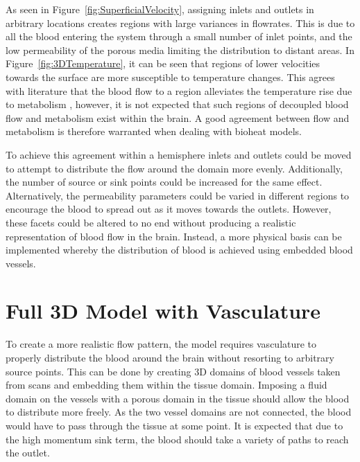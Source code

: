\documentclass[11pt,english,a4paper,twoside,openright]{report}
\begin{document}
{{{{{{{{As seen in Figure~\ref{fig:SuperficialVelocity}, assigning inlets and outlets in arbitrary locations creates regions with large variances in flowrates. This is due to all the blood entering the system through a small number of inlet points, and the low permeability of the porous media limiting the distribution to distant areas. In Figure~\ref{fig:3DTemperature}, it can be seen that regions of lower velocities towards the surface are more susceptible to temperature changes. This agrees with literature that the blood flow to a region alleviates the temperature rise due to metabolism \cite{sukstanskii2006theoretical}, however, it is not expected that such regions of decoupled blood flow and metabolism exist within the brain. A good agreement between flow and metabolism is therefore warranted when dealing with bioheat models. 

To achieve this agreement within a hemisphere inlets and outlets could be moved to attempt to distribute the flow around the domain more evenly. Additionally, the number of source or sink points could be increased for the same effect. Alternatively, the permeability parameters could be varied in different regions to encourage the blood to spread out as it moves towards the outlets. However, these facets could be altered to no end without producing a realistic representation of blood flow in the brain. Instead, a more physical basis can be implemented whereby the distribution of blood is achieved using embedded blood vessels.

\section[Full 3D Model with Vasculature]{{\Large F}ull {\Large 3D} {\Large M}odel with {\Large V}asculature}

To create a more realistic flow pattern, the model requires vasculature to properly distribute the blood around the brain without resorting to arbitrary source points. This can be done by creating 3D domains of blood vessels taken from scans and embedding them within the tissue domain. Imposing a fluid domain on the vessels with a porous domain in the tissue should allow the blood to distribute more freely. As the two vessel domains are not connected, the blood would have to pass through the tissue at some point. It is expected that due to the high momentum sink term, the blood should take a variety of paths to reach the outlet. 

}}}}}}}}
\end{document}
